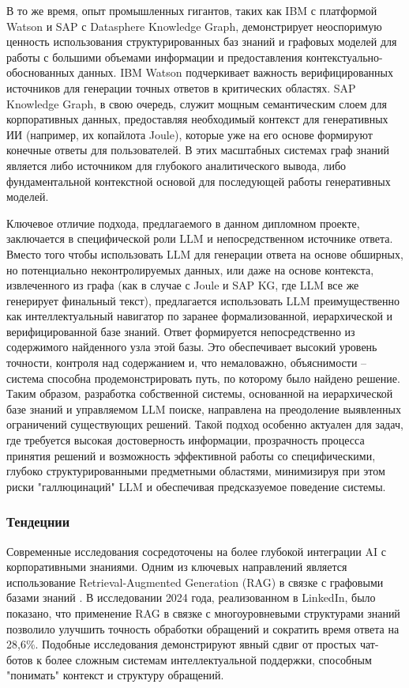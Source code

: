 В то же время, опыт промышленных гигантов, таких как IBM с платформой Watson и SAP с Datasphere Knowledge Graph, демонстрирует неоспоримую ценность использования структурированных баз знаний и графовых моделей для работы с большими объемами информации и предоставления контекстуально-обоснованных данных. IBM Watson подчеркивает важность верифицированных источников для генерации точных ответов в критических областях. SAP Knowledge Graph, в свою очередь, служит мощным семантическим слоем для корпоративных данных, предоставляя необходимый контекст для генеративных ИИ (например, их копайлота Joule), которые уже на его основе формируют конечные ответы для пользователей. В этих масштабных системах граф знаний является либо источником для глубокого аналитического вывода, либо фундаментальной контекстной основой для последующей работы генеративных моделей.

Ключевое отличие подхода, предлагаемого в данном дипломном проекте, заключается в специфической роли LLM и непосредственном источнике ответа. Вместо того чтобы использовать LLM для генерации ответа на основе обширных, но потенциально неконтролируемых данных, или даже на основе контекста, извлеченного из графа (как в случае с Joule и SAP KG, где LLM все же генерирует финальный текст), предлагается использовать LLM преимущественно как интеллектуальный навигатор по заранее формализованной, иерархической и верифицированной базе знаний. Ответ формируется непосредственно из содержимого найденного узла этой базы. Это обеспечивает высокий уровень точности, контроля над содержанием и, что немаловажно, объяснимости – система способна продемонстрировать путь, по которому было найдено решение.
Таким образом, разработка собственной системы, основанной на иерархической базе знаний и управляемом LLM поиске, направлена на преодоление выявленных ограничений существующих решений. Такой подход особенно актуален для задач, где требуется высокая достоверность информации, прозрачность процесса принятия решений и возможность эффективной работы со специфическими, глубоко структурированными предметными областями, минимизируя при этом риски "галлюцинаций" LLM и обеспечивая предсказуемое поведение системы.

\subsubsection{Тендецнии}

Современные исследования сосредоточены на более глубокой интеграции AI с корпоративными знаниями. Одним из ключевых направлений является использование Retrieval-Augmented Generation (RAG) в связке с графовыми базами знаний \cite{arxiv}. В исследовании 2024 года, реализованном в LinkedIn, было показано, что применение RAG в связке с многоуровневыми структурами знаний позволило улучшить точность обработки обращений и сократить время ответа на 28,6\%. Подобные исследования демонстрируют явный сдвиг от простых чат-ботов к более сложным системам интеллектуальной поддержки, способным "понимать" контекст и структуру обращений.

